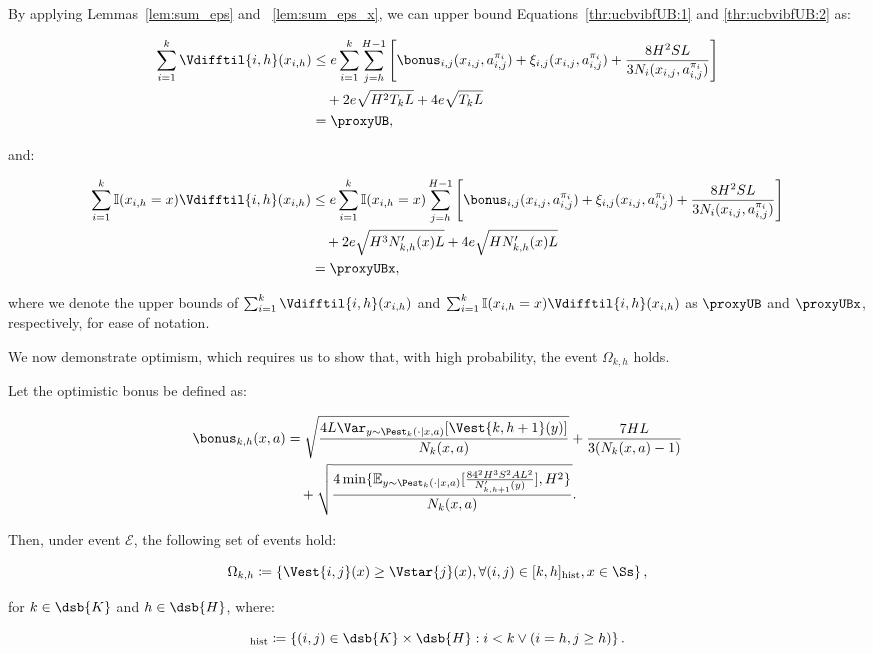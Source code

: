 By applying Lemmas~\ref{lem:sum_eps} and ~\ref{lem:sum_eps_x}, we can upper bound Equations~\eqref{thr:ucbvibfUB:1} and \eqref{thr:ucbvibfUB:2} as:

\begin{align*}
    \sum_{i=1}^k \Vdifftil{i,h}(x_{i,h}) &\le e \sum_{i=1}^k \sum_{j=h}^{H-1} \left[ \bonus_{i,j}(x_{i,j},a_{i,j}^{\pi_i}) + \xi_{i,j} (x_{i,j}, a_{i,j}^{\pi_i}) + \frac{8H^2SL}{3 N_i (x_{i,j}, a_{i,j}^{\pi_i})} \right] \\
    &\quad + 2e\sqrt{H^2T_kL} + 4e\sqrt{T_kL} \\
    &= \proxyUB,
\end{align*}

and:

\begin{align*}
    \sum_{i=1}^k \mathbb{I}(x_{i,h} = x) \Vdifftil{i,h}(x_{i,h}) &\le e \sum_{i=1}^k \mathbb{I}(x_{i,h} = x) \sum_{j=h}^{H-1} \left[ \bonus_{i,j}(x_{i,j},a_{i,j}^{\pi_i}) + \xi_{i,j} (x_{i,j}, a_{i,j}^{\pi_i}) + \frac{8H^2SL}{3 N_i (x_{i,j}, a_{i,j}^{\pi_i})} \right]\\
    &\quad + 2e\sqrt{H^3 N'_{k,h}(x) L} + 4e\sqrt{H N'_{k,h}(x) L} \\
    &= \proxyUBx,
\end{align*}

where we denote the upper bounds of $\sum_{i=1}^k \Vdifftil{i,h}(x_{i,h})$ and $\sum_{i=1}^k \mathbb{I}(x_{i,h} = x) \Vdifftil{i,h}(x_{i,h})$ as $\proxyUB$ and $\proxyUBx$, respectively, for ease of notation.

We now demonstrate optimism, which requires us to show that, with high probability, the event $\Omega_{k,h}$ holds.

\begin{lemma}
\label{lem:BF_opt}
Let the optimistic bonus be defined as:

\begin{align*}
    \bonus_{k,h}(x,a) &= \sqrt{\frac{4 L \Var_{y \sim \Pest_k (\cdot | x,a)} [\Vest{k,h+1}(y)]}{N_k(x,a)}} + \frac{7HL}{3 (N_k(x,a) - 1)} \\
    &\quad + \sqrt{\frac{4 \min\{\mathbb{E}_{y \sim \Pest_k(\cdot|x,a)} [\frac{84^2H^3S^2AL^2}{N'_{k,h+1}(y)}] , H^2\}}{N_k (x,a)}}.
\end{align*}

Then, under event $\mathcal{E}$, the following set of events hold:

\begin{equation*}
    \Omega_{k,h} \coloneqq \left\{ \Vest{i,j}(x) \ge \Vstar{j}(x), \forall (i,j) \in [k,h]_{\mathrm{hist}}, x \in \Ss \right\},
\end{equation*}

for $k \in \dsb{K}$ and $h \in \dsb{H}$, where:

\begin{equation*}
    [k,h]_{\mathrm{hist}} \coloneqq \left\{ (i,j) \in \dsb{K} \times \dsb{H} : i < k \vee (i=h, j \ge h) \right\}.
\end{equation*}
\end{lemma}

